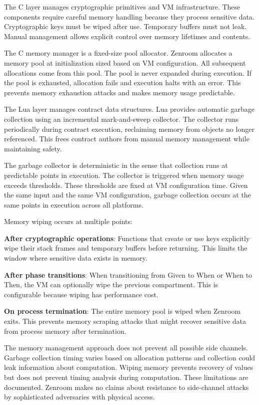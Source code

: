 The C layer manages cryptographic primitives and VM
infrastructure. These components require careful memory handling
because they process sensitive data. Cryptographic keys must be wiped
after use. Temporary buffers must not leak. Manual management allows
explicit control over memory lifetimes and contents.

The C memory manager is a fixed-size pool allocator. Zenroom allocates
a memory pool at initialization sized based on VM configuration. All
subsequent allocations come from this pool. The pool is never expanded
during execution. If the pool is exhausted, allocation fails and
execution halts with an error. This prevents memory exhaustion attacks
and makes memory usage predictable.

The Lua layer manages contract data structures. Lua provides automatic
garbage collection using an incremental mark-and-sweep collector. The
collector runs periodically during contract execution, reclaiming
memory from objects no longer referenced. This frees contract authors
from manual memory management while maintaining safety.

The garbage collector is deterministic in the sense that collection
runs at predictable points in execution. The collector is triggered
when memory usage exceeds thresholds. These thresholds are fixed at VM
configuration time. Given the same input and the same VM
configuration, garbage collection occurs at the same points in
execution across all platforms.

Memory wiping occurs at multiple points:

\textbf{After cryptographic operations}: Functions that create or use
keys explicitly wipe their stack frames and temporary buffers before
returning. This limits the window where sensitive data exists in
memory.

\textbf{After phase transitions}: When transitioning from Given to
When or When to Then, the VM can optionally wipe the previous
compartment. This is configurable because wiping has performance cost.

\textbf{On process termination}: The entire memory pool is wiped when
Zenroom exits. This prevents memory scraping attacks that might
recover sensitive data from process memory after termination.

The memory management approach does not prevent all possible side
channels. Garbage collection timing varies based on allocation
patterns and collection could leak information about
computation. Wiping memory prevents recovery of values but does not
prevent timing analysis during computation. These limitations are
documented. Zenroom makes no claims about resistance to side-channel
attacks by sophisticated adversaries with physical access.

